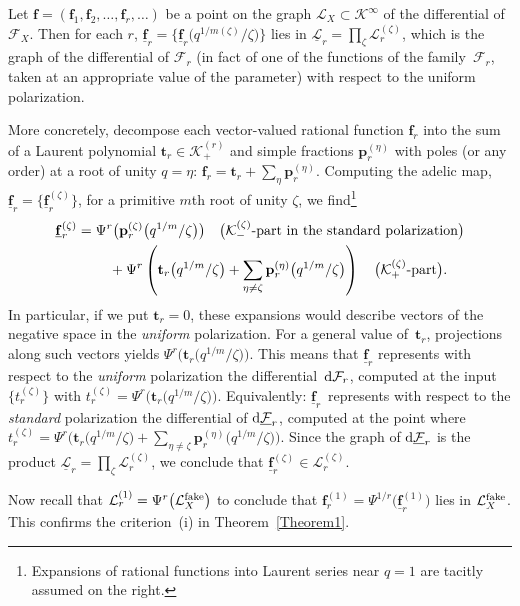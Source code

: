 \documentclass[pdftex]{sigma}
\def\F{\mathcal F}
\def\K{\mathcal K}
\def\L{\mathcal L}
\def\f{{\mathbf f}}
\def\t{{\mathbf t}}
\def\pp{{\mathbf p}}
\def\und{\underline}
\begin{document}
Let $\f =(\f_1,\f_2,\dots,\f_r,\dots)$ be a point on the graph $\L_X\subset \K^{\infty}$ of the differential of $\F_X$. Then for each $r$,
$\und{\f}_r =\big\{ \und{\f}_r\big(q^{1/m(\zeta)}/\zeta\big) \big\}$ lies in $\und{\L}_r=\prod_{\zeta} \L_r^{(\zeta)}$, which is the graph of the differential of $\F_r$ (in fact of one of the functions of the family~$\F_r$, taken at an appropriate value of the parameter) with respect to the uniform polarization.

More concretely, decompose each vector-valued rational function $\f_r$ into the sum of a Laurent polynomial $\t_r\in \K^{(r)}_{+}$ and simple fractions $\pp_r^{(\eta)}$ with poles (or any order) at a root of unity $q=\eta$:
$\f_r = \t_r + \sum_{\eta} \pp_r^{(\eta)}$. Computing the adelic map,
$\und{\f}_r = \big\{ \und{\f}_r^{(\zeta)} \big\}$, for a primitive $m$th root of unity $\zeta$, we find\footnote{Expansions of rational functions into Laurent series near $q=1$ are tacitly assumed on the right.}
\begin{gather*} \und{\f}_r^{(\zeta)} = \Psi^r\big(\pp_r^{(\zeta)}\big(q^{1/m}/\zeta\big)\big) \quad \big(\text{$\K^{(\zeta)}_{-}$-part in the standard polarization}\big) \\
\hphantom{\und{\f}_r^{(\zeta)} =}{} +\Psi^r\left( \t_r\big(q^{1/m}/\zeta\big) + \sum_{\eta\neq\zeta} \pp_r^{(\eta)}\big(q^{1/m}/\zeta\big)\right) \quad \big(\text{$\K^{(\zeta)}_{+}$-part}\big).
\end{gather*}
In particular, if we put $\t_r=0$, these expansions would describe vectors of the negative space in the {\em uniform} polarization. For a general value of~$\t_r$, projections along such vectors yields $\Psi^r\big(\t_r\big(q^{1/m}/\zeta\big)\big)$. This means that $\und{\f}_r$ represents with respect to the {\em uniform} polarization the differential~${\rm d}\F_r$, computed at the input $\big\{ t_r^{(\zeta)}\big\}$ with $t_r^{(\zeta)} =\Psi^r\big(\t_r\big(q^{1/m}/\zeta\big)\big)$. Equivalently: $\und{\f}_r$~represents with respect to the {\em standard} polarization the differential of ${\rm d}\und{\F}_r$, computed at the point where $t_r^{(\zeta)} =\Psi^r\big(\t_r\big(q^{1/m}/\zeta\big) + \sum_{\eta\neq\zeta} \pp_r^{(\eta)}\big(q^{1/m}/\zeta\big)\big)$.
Since the graph of ${\rm d}\und{\F}_r$ is the product $\und{\L}_r=\prod_{\zeta} \L_r^{(\zeta)}$, we conclude that $\und{\f}_r^{(\zeta)} \in \L_r^{(\zeta)}$.

Now recall that $\L_r^{(1)}=\Psi^r\big(\L_X^{\rm fake}\big)$ to conclude that $\f_r^{(1)}=\Psi^{1/r}\big(\und{\f}_r^{(1)}\big)$ lies in $\L_X^{\rm fake}$. This confirms the criterion~(i) in Theorem~\ref{Theorem1}.
\end{document}
